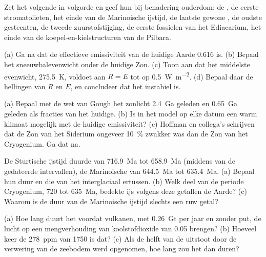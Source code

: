 \begin{exercise}[$\star$]\label{exo:b2:precambrian-earth:4}
Zet het volgende in volgorde en geef hun bij benadering ouderdom: de , de
eerste stromatolieten, het einde van de Marinoische ijstijd, de laatste gewone , de
oudste gesteenten, de tweede zuurstofstijging, de eerste fossielen van het Ediacarium, het einde van de
koepel-en-kielstructuren van de Pilbara.
\end{exercise}

\begin{exercise}[$\star\star$]\label{exo:b2:precambrian-earth:5}
(a) Ga na dat de effectieve emissiviteit van de huidige Aarde 0.616 is. (b) Bepaal het
sneeuwbalevenwicht onder de huidige Zon. (c) Toon aan dat het middelste evenwicht, \qty{275.5}{K}, voldoet aan
$R = E$ tot op \qty{0.5}{W.m^{-2}}. (d) Bepaal daar de hellingen van $R$ en $E$, en concludeer
dat het instabiel is.
\end{exercise}

\begin{exercise}[$\star\star$]\label{exo:b2:precambrian-earth:6}
(a) Bepaal met de wet van Gough het zonlicht \qty{2.4}{Ga} geleden en \qty{0.65}{Ga} geleden als fracties
van het huidige. (b) Is in het model op elke datum een warm klimaat mogelijk met de huidige emissiviteit?
(c) Hoffman en collega's schrijven dat de Zon van het Siderium ongeveer \qty{10}{\percent} zwakker was dan
de Zon van het Cryogenium. Ga dat na.
\end{exercise}

\begin{exercise}[$\star\star$]\label{exo:b2:precambrian-earth:7}
De Sturtische ijstijd duurde van \qty{716.9}{Ma} tot \qty{658.9}{Ma} (middens van de gedateerde intervallen),
de Marinoische van \qty{644.5}{Ma} tot \qty{635.4}{Ma}. (a) Bepaal hun duur en die van het
interglaciaal ertussen. (b) Welk deel van de periode Cryogenium, 720 tot \qty{635}{Ma},
bedekte ijs volgens deze getallen de Aarde? (c) Waarom is de duur van de Marinoische ijstijd slechts een
ruw getal?
\end{exercise}

\begin{exercise}[$\star\star$]\label{exo:b2:precambrian-earth:8}
(a) Hoe lang duurt het voordat vulkanen, met \qty{0.26}{Gt} per jaar en zonder put, de lucht op
een mengverhouding van koolstofdioxide van 0.05 brengen? (b) Hoeveel keer de \qty{278}{ppm} van 1750 is dat? (c) Als de helft van de uitstoot door de verwering van de
zeebodem werd opgenomen, hoe lang zou het dan duren?
\end{exercise}

